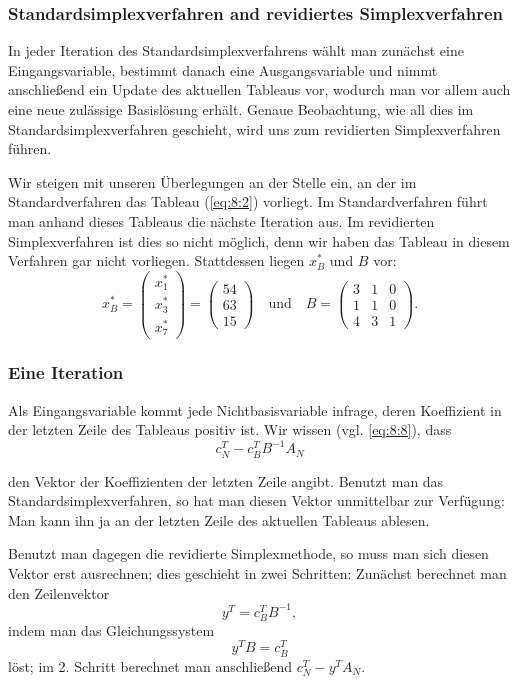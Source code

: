 \documentclass[smaller]{beamer}
\begin{document}
\begin{frame}
 \frametitle{Standardsimplexverfahren and revidiertes Simplexverfahren}
 In jeder Iteration des Standardsimplexverfahrens wählt man zunächst eine Eingangsvariable, bestimmt danach eine Ausgangsvariable und nimmt anschließend ein Update des aktuellen Tableaus vor, wodurch man vor allem auch eine neue zulässige Basislösung erhält. Genaue Beobachtung, wie all dies im Standardsimplexverfahren geschieht, wird uns zum revidierten Simplexverfahren führen. \\ \vspace*{0.2cm}

Wir steigen mit unseren Überlegungen an der Stelle ein, an der im Standardverfahren das Tableau (\ref{eq:8:2}) vorliegt. Im Standardverfahren führt man anhand dieses Tableaus die nächste Iteration aus. \alert{Im revidierten Simplexverfahren ist dies so nicht möglich, denn wir haben das Tableau in diesem Verfahren gar nicht vorliegen.} Stattdessen liegen $x_B^*$ und $B$ vor:
\[
x_B^* = \begin{pmatrix} x_1^* \\ x_3^* \\ x_7^* \end{pmatrix} = \begin{pmatrix} 54 \\ 63 \\ 15 \end{pmatrix} \quad \text{und} \quad
B = \begin{pmatrix} 3 & 1 & 0 \\ 1 & 1 & 0 \\ 4 & 3 & 1 \end{pmatrix}.
\]
\end{frame}

\begin{frame}
 \frametitle{Eine Iteration}
 Als Eingangsvariable kommt jede Nichtbasisvariable infrage, deren Koeffizient in der letzten Zeile des Tableaus positiv ist. Wir wissen (vgl. \eqref{eq:8:8}), dass
\[
c_N^T - c_B^TB^{-1}A_N
\]

den Vektor der Koeffizienten der letzten Zeile angibt. \alert{Benutzt man das Standardsimplexverfahren, so hat man diesen Vektor unmittelbar zur Verfügung}: Man kann ihn ja an der letzten Zeile des aktuellen Tableaus ablesen. \\ \vspace*{0.2cm}

\alert{Benutzt man dagegen die revidierte Simplexmethode, so muss man sich diesen Vektor erst ausrechnen}; dies geschieht in zwei Schritten: Zunächst berechnet man den Zeilenvektor
\[
y^T = c_B^T B^{-1},
\]
indem man das Gleichungssystem
\[
y^TB = c_B^T
\]
löst; im 2. Schritt berechnet man anschließend $c_N^T - y^TA_N$.
\end{frame}
\end{document}
